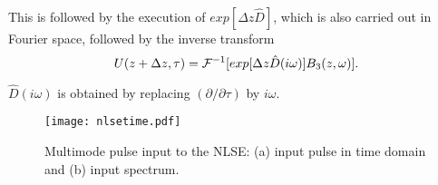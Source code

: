 This is followed by the execution of $exp[\Delta z \hat{D}]$, which is also
carried out in Fourier space, followed by the inverse transform
\begin{equation}
U(z + \Delta z,\tau) = {\cal{F}}^{-1}[exp[\Delta z \hat{D}(i\omega)]B_{3}(z,\omega)] .
\end{equation}

$\hat{D}(i\omega)$ is obtained by replacing $(\partial / \partial \tau)$
by $i \omega$.

\begin{figure}
\begin{center}
\texttt{[image: nlsetime.pdf]}
\end{center}
\renewcommand{\baselinestretch}{1}
\small\normalsize
\begin{quote}
\caption[Multimode pulse input toe NLSE]
{Multimode pulse input to the NLSE: (a) input pulse in time
domain and (b) input spectrum.}
\label{figA.1}
\end{quote}
\end{figure}
\renewcommand{\baselinestretch}{2}
\small\normalsize

